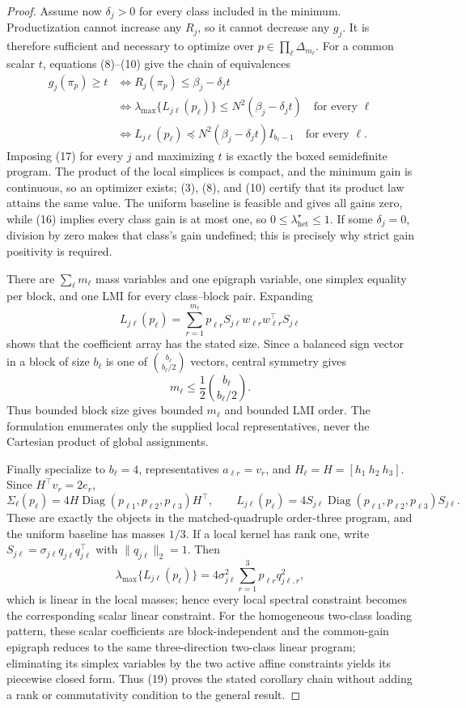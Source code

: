 \documentclass{article}
\begin{document}
\begin{proof}
Assume now \(\delta_j>0\) for every class included in the minimum.  Productization cannot increase any \(R_j\), so it cannot decrease any \(g_j\).  It is therefore sufficient and necessary to optimize over \(p\in\prod_\ell\Delta_{m_\ell}\).  For a common scalar \(t\), equations (8)--(10) give the chain of equivalences
\[
\begin{aligned}
g_j(\pi_p)\ge t
&\iff R_j(\pi_p)\le\beta_j-\delta_jt\\
&\iff \lambda_{\max}\{L_{j\ell}(p_\ell)\}
\le N^2(\beta_j-\delta_jt)\quad\text{for every }\ell\\
&\iff L_{j\ell}(p_\ell)
\preceq N^2(\beta_j-\delta_jt)I_{b_\ell-1}
\quad\text{for every }\ell.
\end{aligned}
\tag{17}
\]
Imposing (17) for every \(j\) and maximizing \(t\) is exactly the boxed semidefinite program.  The product of the local simplices is compact, and the minimum gain is continuous, so an optimizer exists; (3), (8), and (10) certify that its product law attains the same value.  The uniform baseline is feasible and gives all gains zero, while (16) implies every class gain is at most one, so \(0\le\lambda_{\mathrm{het}}^\star\le1\).  If some \(\delta_j=0\), division by zero makes that class's gain undefined; this is precisely why strict gain positivity is required.

There are \(\sum_\ell m_\ell\) mass variables and one epigraph variable, one simplex equality per block, and one LMI for every class--block pair.  Expanding
\[
L_{j\ell}(p_\ell)
=\sum_{r=1}^{m_\ell}p_{\ell r}
S_{j\ell}w_{\ell r}w_{\ell r}^\top S_{j\ell}
\]
shows that the coefficient array has the stated size.  Since a balanced sign vector in a block of size \(b_\ell\) is one of \(\binom{b_\ell}{b_\ell/2}\) vectors, central symmetry gives
\[
m_\ell\le\frac12\binom{b_\ell}{b_\ell/2}.
\tag{18}
\]
Thus bounded block size gives bounded \(m_\ell\) and bounded LMI order.  The formulation enumerates only the supplied local representatives, never the Cartesian product of global assignments.

Finally specialize to \(b_\ell=4\), representatives \(a_{\ell r}=v_r\), and \(H_\ell=H=[h_1\ h_2\ h_3]\).  Since \(H^\top v_r=2e_r\),
\[
\Sigma_\ell(p_\ell)=4H\operatorname{Diag}(p_{\ell1},p_{\ell2},p_{\ell3})H^\top,
\qquad
L_{j\ell}(p_\ell)=4S_{j\ell}\operatorname{Diag}(p_{\ell1},p_{\ell2},p_{\ell3})S_{j\ell}.
\tag{19}
\]
These are exactly the objects in the matched-quadruple order-three program, and the uniform baseline has masses \(1/3\).  If a local kernel has rank one, write \(S_{j\ell}=\sigma_{j\ell}q_{j\ell}q_{j\ell}^\top\) with \(\|q_{j\ell}\|_2=1\).  Then
\[
\lambda_{\max}\{L_{j\ell}(p_\ell)\}
=4\sigma_{j\ell}^2\sum_{r=1}^3p_{\ell r}q_{j\ell,r}^2,
\]
which is linear in the local masses; hence every local spectral constraint becomes the corresponding scalar linear constraint.  For the homogeneous two-class loading pattern, these scalar coefficients are block-independent and the common-gain epigraph reduces to the same three-direction two-class linear program; eliminating its simplex variables by the two active affine constraints yields its piecewise closed form.  Thus (19) proves the stated corollary chain without adding a rank or commutativity condition to the general result.


\end{proof}
\end{document}
